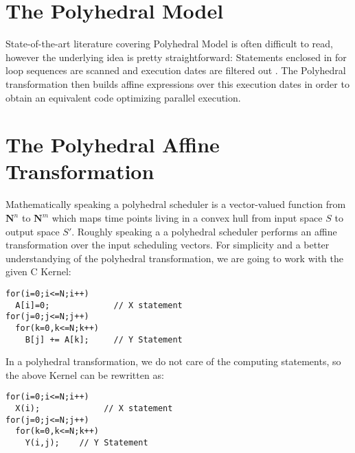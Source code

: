 \documentclass[10pt, a4paper, twocolumn]{paper}
\begin{document}

\twocolumn[
  \begin{@twocolumnfalse}
    \maketitle
    \begin{abstract}
      \abstractText
      \newline
      \newline
    \end{abstract}
  \end{@twocolumnfalse}
]


\section{The Polyhedral Model}

State-of-the-art literature covering Polyhedral Model is often difficult to read, however the underlying idea is pretty straightforward: Statements enclosed in for loop sequences are scanned and execution dates are filtered out . The Polyhedral transformation then builds affine expressions over this execution dates in order to obtain an equivalent code optimizing parallel execution.

\section{The Polyhedral Affine Transformation}
Mathematically speaking a polyhedral scheduler is a vector-valued function from $\mathbf{N}^n$ to $\mathbf{N}^m$ which maps time points living in a convex hull from input space $S$ to output space $S'$. Roughly speaking a a polyhedral scheduler performs an affine transformation over the input scheduling vectors. For simplicity and a better understandying of the polyhedral transformation, we are going to work with the given C Kernel:
\begin{verbatim}
for(i=0;i<=N;i++)
  A[i]=0;             // X statement
for(j=0;j<=N;j++)
  for(k=0,k<=N;k++)
    B[j] += A[k];     // Y Statement
\end{verbatim}
 	
In a polyhedral transformation, we do not care of the computing statements, so the above Kernel can be rewritten as:

\begin{verbatim}
for(i=0;i<=N;i++)
  X(i);             // X statement
for(j=0;j<=N;j++)
  for(k=0,k<=N;k++)
    Y(i,j);    // Y Statement
\end{verbatim}
\end{document}
